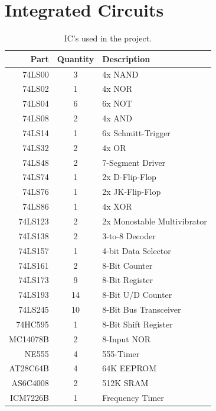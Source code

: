 \section{Integrated Circuits}
\begin{table}[H]
  \centering
  \begin{tabular}{r|c|l}
    Part                     & Quantity & Description \\\hline
    74LS00                   & 3 & 4x NAND \\
    74LS02                   & 1 & 4x NOR \\
    74LS04                   & 6 & 6x NOT \\
    74LS08                   & 2 & 4x AND \\
    74LS14                   & 1 & 6x Schmitt-Trigger \\
    74LS32                   & 2 & 4x OR \\
    74LS48                   & 2 & 7-Segment Driver  \\
    74LS74                   & 1 & 2x D-Flip-Flop  \\
    74LS76                   & 1 & 2x JK-Flip-Flop  \\
    74LS86                   & 1 & 4x XOR  \\
    74LS123                  & 2 & 2x Monostable Multivibrator  \\
    74LS138                  & 2 & 3-to-8 Decoder  \\
    74LS157                  & 1 & 4-bit Data Selector \\
    74LS161                  & 2 & 8-Bit Counter  \\
    74LS173                  & 9 & 8-Bit Register  \\
    74LS193                  & 14 & 8-Bit U/D Counter  \\
    74LS245                  & 10 & 8-Bit Bus Transceiver  \\
    74HC595                  & 1 & 8-Bit Shift Register  \\
    MC14078B                 & 2 & 8-Input NOR  \\
    NE555                    & 4 & 555-Timer \\
    AT28C64B                 & 4 & 64K EEPROM  \\
    AS6C4008                 & 2 & 512K SRAM  \\
    ICM7226B                 & 1 & Frequency Timer  \\
  \end{tabular}
  \caption{IC's used in the project.}
  \label{tab:parts}
\end{table}

